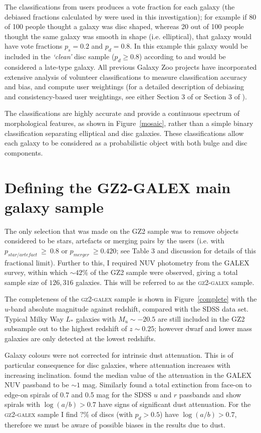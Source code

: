 The classifications from users produces a vote fraction for each galaxy (the debiased fractions calculated by \citet{GZ2} were used in this investigation); for example if 80 of 100 people thought a galaxy was disc shaped, whereas 20 out of 100 people thought the same galaxy was smooth in shape (i.e. elliptical), that galaxy would have vote fractions $p_{s} = 0.2$ and $p_{d} = 0.8$. In this example this galaxy would be included in the \emph{`clean'} disc sample ($p_d \geq 0.8$) according to \cite{GZ2} and would be considered a late-type galaxy. All previous Galaxy Zoo projects have incorporated extensive analysis of volunteer classifications to measure classification accuracy and bias, and compute user weightings (for a detailed description of debiasing and consistency-based user weightings, see either Section 3 of \citealt{Lintott09} or Section 3 of \citealt{GZ2}). 


The classifications are highly accurate and provide a continuous spectrum of morphological features, as shown in Figure~\ref{mosaic}, rather than a simple binary classification separating elliptical and disc galaxies. These classifications allow each galaxy to be considered as a probabilistic object with both bulge and disc components. 

\section{Defining the GZ2-GALEX main galaxy sample}\label{sec:defsample}

The only selection that was made on the GZ2 sample was to remove objects considered to be stars, artefacts or merging pairs by the users (i.e. with $p_{star/artefact} ~\geq~ 0.8$ or $p_{merger} ~\geq 0.420$; see \citealt{GZ2} Table 3 and discussion for details of this fractional limit). Further to this, I required NUV photometry from the GALEX survey, within which $\sim42\%$ of the GZ2 sample were observed, giving a total sample size of $126, 316$ galaxies. This will be referred to as the \textsc{gz2-galex} sample. 

The completeness of the \textsc{gz2-galex} sample is shown in Figure~\ref{complete} with the $u$-band absolute magnitude against redshift, compared with the SDSS data set. Typical Milky Way $L_*$ galaxies with $M_u \sim -20.5$ are still included in the GZ2 subsample out to the highest redshift of $z \sim 0.25$; however dwarf and lower mass galaxies are only detected at the lowest redshifts.

Galaxy colours were not corrected for intrinsic dust attenuation. This is of particular consequence for disc galaxies, where attenuation increases with increasing inclination. \cite{Buat05} found the median value of the attenuation in the GALEX NUV passband to be $\sim 1$ mag. Similarly \cite{masters10a} found a total extinction from face-on to edge-on spirals of 0.7 and 0.5 mag for the SDSS $u$ and $r$ passbands and show spirals with $\log(a/b) > 0.7$ have signs of significant dust attenuation. For the \textsc{gz2-galex} sample I find $?\%$ of discs (with $p_d > 0.5$) have $\log(a/b) > 0.7$, therefore we must be aware of possible biases in the results due to dust. 

